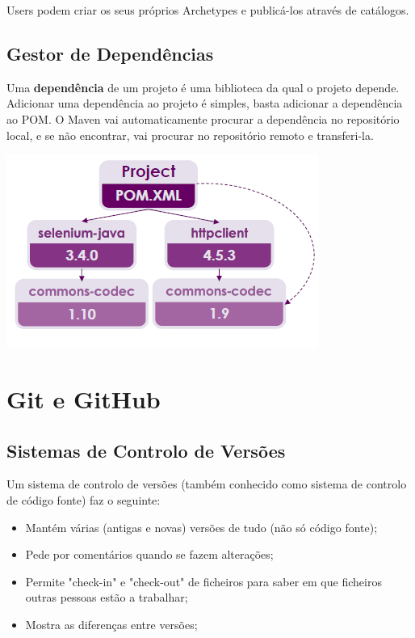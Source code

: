 \documentclass{article}
\begin{document}
Users podem criar os seus próprios Archetypes e publicá-los através de catálogos.

\subsection{Gestor de Dependências}

Uma \textbf{dependência} de um projeto é uma biblioteca da qual
o projeto depende. Adicionar uma dependência ao projeto é simples,
basta adicionar a dependência ao POM. O Maven vai automaticamente
procurar a dependência no repositório local, e se não encontrar,
vai procurar no repositório remoto e transferi-la.

\begin{center}
  \includegraphics[scale=0.6]{3}
\end{center}

\pagebreak

\section{Git e GitHub}

\subsection{Sistemas de Controlo de Versões}

Um sistema de controlo de versões (também conhecido como sistema de controlo de código fonte) faz o seguinte:
\begin{itemize}
  \item Mantém várias (antigas e novas) versões de tudo (não só código fonte);
  \item Pede por comentários quando se fazem alterações;
  \item Permite "check-in" e "check-out" de ficheiros para saber
  em que ficheiros outras pessoas estão a trabalhar;
  \item Mostra as diferenças entre versões;
\end{itemize}
\end{document}
